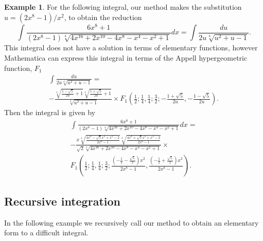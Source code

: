 \documentclass[12pt]{article}
\numberwithin{equation}{section}
\theoremstyle{definition}
\newtheorem{example}{Example}[section]
\begin{document}
\begin{example}
For the following integral, our method makes the substitution 
$u = \left(2 x^8 - 1\right)/x^2$, to obtain the reduction
\begin{equation*}
\int\frac{6 x^8+1}{\left(2 x^8-1\right) \sqrt[4]{4 x^{16}+2 x^{10}-4 x^8-x^4-x^2+1}}dx = 
\int\frac{du}{2 u \sqrt[4]{u^2+u-1}}.
\end{equation*}
This integral does not have a solution in terms of elementary functions, however Mathematica
can express this integral in terms of the Appell hypergeometric function, 
\href{https://reference.wolfram.com/language/ref/AppellF1.html}{$F_1$}
\begin{multline*}
\int\frac{du}{2 u \sqrt[4]{u^2+u-1}} = \\
-\frac{\sqrt[4]{\frac{1-\sqrt{5}}{2 u}+1} \sqrt[4]{\frac{1+\sqrt{5}}{2 u}+1}}{\sqrt[4]{u^2+u-1}} \times
F_1\left(\frac{1}{2};\frac{1}{4},\frac{1}{4};\frac{3}{2};-\frac{1+\sqrt{5}}{2u},-\frac{1-\sqrt{5}}{2 u}\right).
\end{multline*}
Then the integral is given by 
\begin{multline*}
\int\frac{6 x^8+1}{\left(2 x^8-1\right) \sqrt[4]{4 x^{16}+2 x^{10}-4 x^8-x^4-x^2+1}}dx = \\
-\frac{x \sqrt[4]{\frac{4 x^8-\sqrt{5} x^2+x^2-2}{2 x^8-1}} \sqrt[4]{\frac{4 x^8+\sqrt{5}x^2+x^2-2}{2 x^8-1}}}
{\sqrt{2} \sqrt[4]{4 x^{16}+2 x^{10}-4 x^8-x^4-x^2+1}} \times \\
F_1\left(\frac{1}{2};\frac{1}{4},\frac{1}{4};\frac{3}{2};\frac{\left(-\frac{1}{2}-\frac{\sqrt{5}}{2}\right) x^2}{2 x^8-1},\frac{\left(-\frac{1}{2}+\frac{\sqrt{5}}{2}\right) x^2}{2x^8-1}\right).
\end{multline*}
\end{example}

\subsection{Recursive integration}

In the following example we recursively call our method to obtain an elementary form 
to a difficult integral. 
\end{document}
